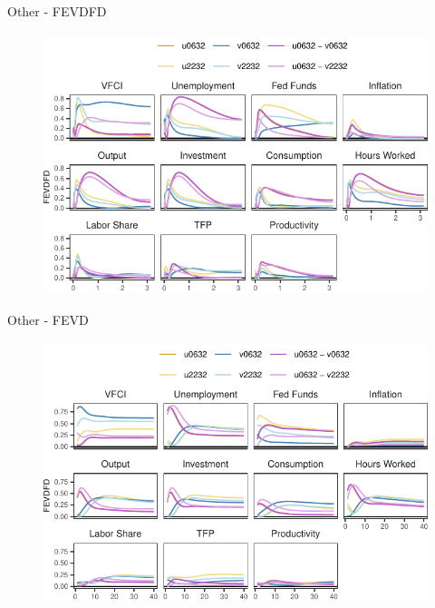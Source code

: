 \begin{frame}{Other - FEVDFD }
    
    \vspace{-0.25cm}
    
    \begin{figure}
        \includegraphics[height = 3in]{figs/fig9_fevdfd.pdf}
    \end{figure}

\end{frame}


\begin{frame}{Other - FEVD }
    
    \vspace{-0.25cm}
     
    \begin{figure}
        \includegraphics[height = 3in]{figs/fig10_fevd.pdf}
    \end{figure}   

\end{frame}
